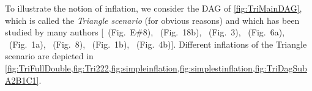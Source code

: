 To illustrate the notion of inflation, we consider the DAG of \cref{fig:TriMainDAG}, which is called the {\em Triangle scenario} (for obvious reasons) and which has been studied by many authors [\citealp{pusey2014gdag}~(Fig.~E\#8), \citealp{WoodSpekkens}~(Fig.~18b), \citealp{fritz2012bell}~(Fig.~3), \citealp{chaves2014novel}~(Fig.~6a), \citealp{Chaves2015infoquantum}~(Fig.~1a), \citealp{BilocalCorrelations}~(Fig.~8), \citealp{steudel2010ancestors}~(Fig.~1b), \citealp{chaves2014informationinference}~(Fig.~4b)].
Different inflations of the Triangle scenario are depicted in \cref{fig:TriFullDouble,fig:Tri222,fig:simpleinflation,fig:simplestinflation,fig:TriDagSubA2B1C1}.

